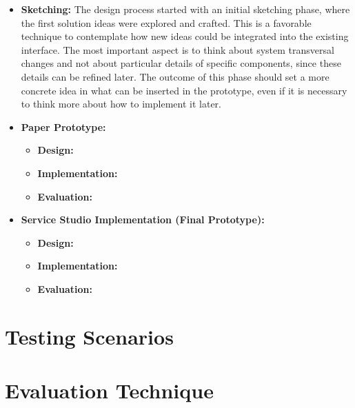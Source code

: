 \begin{itemize}
    \item \textbf{Sketching: }The design process started with an initial sketching phase, where the first solution ideas were explored and crafted. This is a favorable technique to contemplate how new ideas could be integrated into the existing interface. The most important aspect is to think about system transversal changes and not about particular details of specific components, since these details can be refined later. The outcome of this phase should set a more concrete idea in what can be inserted in the prototype, even if it is necessary to think more about how to implement it later.
    \item \textbf{Paper Prototype: }
    \begin{itemize}
        \item \textbf{Design: }
        \item \textbf{Implementation: }
        \item \textbf{Evaluation: }
    \end{itemize}
    \item \textbf{Service Studio Implementation (Final Prototype): }
    \begin{itemize}
        \item \textbf{Design: }
        \item \textbf{Implementation: }
        \item \textbf{Evaluation: }
    \end{itemize}
\end{itemize}

\section{Testing Scenarios}
\label{sec:testing_scenarios}

\section{Evaluation Technique}
\label{sec:evaluation_technique}
